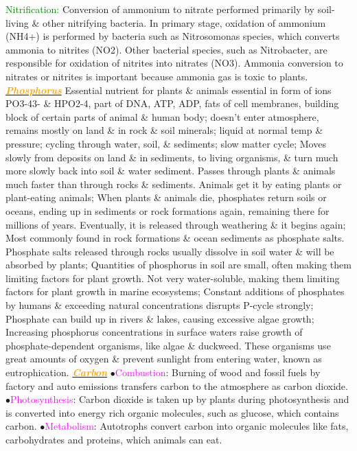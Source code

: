 \documentclass{article}
\newcommand{\ddd}{$\bullet$}
\newcommand{\green}[1]{\textcolor{green}{#1}}
\newcommand{\pink}[1]{\textcolor{magenta}{#1}}
\newcommand{\orange}[1]{\textcolor{orange}{#1}}
\newcommand{\mysubsection}[1]{\underline{\textbf{{\textit{\orange{#1}}}}}}
\newcommand{\mysubsub}[1]{{{\green{#1}}}}
\newcommand{\vocab}[1]{{\pink{#1}}}
\begin{document}
\begin{multicols*}{4}
			\mysubsub{Nitrification: } 
				Conversion of ammonium to nitrate performed primarily by soil-living \& other nitrifying bacteria. In primary stage, oxidation of ammonium (NH4+) is performed by bacteria such as Nitrosomonas species, which converts ammonia to nitrites (NO2). Other bacterial species, such as Nitrobacter, are responsible for oxidation of nitrites into nitrates (NO3). Ammonia conversion to nitrates or nitrites is important because ammonia gas is toxic to plants.
		\mysubsection{Phosphorus}
 			Essential nutrient for plants \& animals essential in form of ions PO3-43- \& HPO2-4, part of DNA, ATP, ADP, fats of cell membranes, building block of certain parts of animal \& human body; doesn’t enter atmosphere, remains mostly on land \& in rock \& soil minerals; liquid at normal temp \& pressure; cycling through water, soil, \& sediments; slow matter cycle; Moves slowly from deposits on land \& in sediments, to living organisms, \& turn much more slowly back into soil \& water sediment. Passes through plants \& animals much faster than through rocks \& sediments. Animals get it by eating plants or plant-eating animals; When plants \& animals die, phosphates return soils or oceans, ending up in sediments or rock formations again, remaining there for millions of years. Eventually, it is released through weathering \& it begins again; Most commonly found in rock formations \& ocean sediments as phosphate salts. Phosphate salts released through rocks usually dissolve in soil water \& will be absorbed by plants; Quantities of phosphorus in soil are small, often making them limiting factors for plant growth. Not very water-soluble, making them limiting factors for plant growth in marine ecosystems; Constant additions of phosphates by humans \& exceeding natural concentrations disrupts P-cycle strongly; Phosphate can build up in rivers \& lakes, causing excessive algae growth; Increasing phosphorus concentrations in surface waters raise growth of phosphate-dependent organisms, like algae \& duckweed. These organisms use great amounts of oxygen \& prevent sunlight from entering water, known as eutrophication.
		\mysubsection{Carbon}
			\ddd \vocab{Combustion}: Burning of wood and fossil fuels by factory and auto emissions transfers carbon to the atmosphere as carbon dioxide.
			\ddd \vocab{Photosynthesis}: Carbon dioxide is taken up by plants during photosynthesis and is converted into energy rich organic molecules, such as glucose, which contains carbon.
			\ddd \vocab{Metabolism}: Autotrophs convert carbon into organic molecules like fats, carbohydrates and proteins, which animals can eat.

\end{multicols*}
\end{document}
